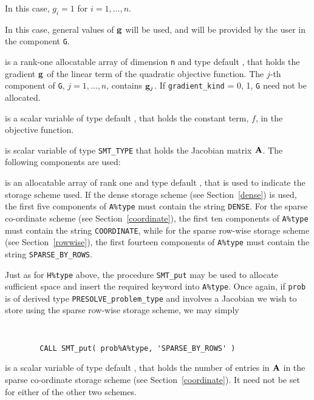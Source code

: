\documentclass{galahad}
\newcommand{\packagename}{PRESOLVE}
\begin{document}
\begin{description}
\begin{description}
 In this case, $g_{i} = 1$ for $i = 1, \ldots ,n$.

 In this case, general values of ${\mathbf{g}}$ will be used,
     and will be provided by the user in the component {\tt G}.
\end{description}

 is a rank-one allocatable array of dimension {\tt n} and type
default \realdp, that holds the gradient ${\mathbf{g}}$
of the linear term of the quadratic objective function.
The $j$-th component of {\tt G}, $j = 1,  \ldots ,  n$, contains ${\mathbf{g}}_{j}$.
If {\tt gradient\_kind} {= 0, 1}, {\tt G} need not be allocated.

 is a scalar variable of type
default \realdp, that holds
the constant term, $f$, in the objective function.

 is scalar variable of type {\tt SMT\_TYPE}
that holds the Jacobian matrix ${\mathbf{A}}$. The following components are used:

\begin{description}

 is an allocatable array of rank one and type default \character, that
is used to indicate the storage scheme used. If the dense storage scheme
(see Section~\ref{dense}) is used,
the first five components of {\tt A\%type} must contain the
string {\tt DENSE}.
For the sparse co-ordinate scheme (see Section~\ref{coordinate}),
the first ten components of {\tt A\%type} must contain the
string {\tt COORDINATE}, while
for the sparse row-wise storage scheme (see Section~\ref{rowwise}),
the first fourteen components of {\tt A\%type} must contain the
string {\tt SPARSE\_BY\_ROWS}.

Just as for {\tt H\%type} above, the procedure {\tt SMT\_put}
may be used to allocate sufficient space and insert the required keyword
into {\tt A\%type}.
Once again, if {\tt prob} is of derived type {\tt \packagename\_problem\_type}
and involves a Jacobian we wish to store using the sparse row-wise
storage scheme, we may simply
{\tt
\begin{verbatim}
        CALL SMT_put( prob%A%type, 'SPARSE_BY_ROWS' )
\end{verbatim}
}
\noindent

 is a scalar variable of type default \integer, that
holds the number of entries in ${\mathbf{A}}$
in the sparse co-ordinate storage scheme (see Section~\ref{coordinate}).
It need not be set for either of the other two schemes.


\end{description}
\end{description}
\end{document}
